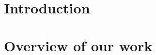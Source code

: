 \documentclass[USenglish,oneside,twocolumn]{article}
\begin{document}
\maketitle

\section{Introduction}
\label{sec:intro}

\section{Overview of our work}
\label{sec:overview}

%
\end{document}
